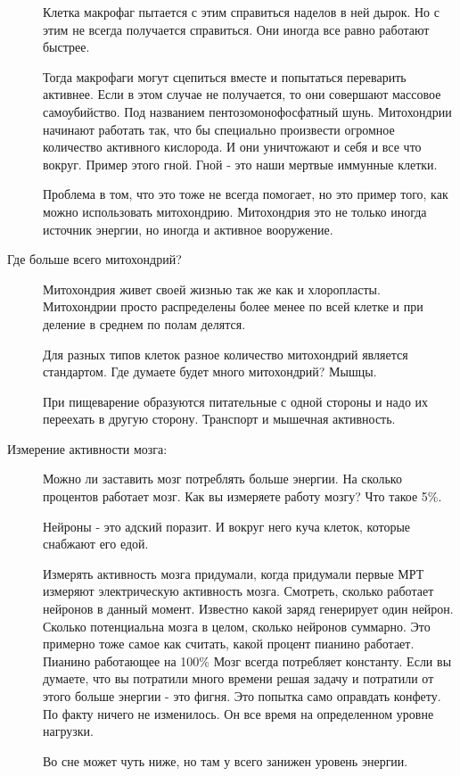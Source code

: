 \begin{description}
Клетка макрофаг пытается с этим справиться наделов в ней дырок. Но 
с этим не всегда получается справиться. Они иногда все равно работают быстрее. 

Тогда макрофаги могут сцепиться вместе и попытаться переварить активнее. 
Если в этом случае не получается, то они совершают массовое самоубийство. 
Под  названием пентозомонофосфатный шунь. Митохондрии начинают работать 
так, что бы специально произвести огромное количество активного кислорода. 
И они уничтожают и себя и все что вокруг. Пример этого гной. Гной - это наши 
мертвые иммунные клетки. 

Проблема в том, что это тоже не всегда помогает, но это 
пример того, как можно использовать митохондрию. Митохондрия 
это не только иногда источник энергии, но иногда и 
активное вооружение. 

\item[Где больше всего митохондрий?]
Митохондрия живет своей жизнью так же как и хлоропласты. Митохондрии 
просто распределены более менее по всей клетке и при деление 
в среднем по полам делятся. 


Для разных типов клеток разное количество митохондрий является стандартом. 
Где думаете будет много митохондрий? Мышцы. 

При пищеварение образуются питательные с одной стороны и надо их 
переехать в другую сторону. Транспорт и мышечная активность. 

\item[Измерение активности мозга:]
Можно ли заставить мозг потреблять больше энергии. 
На сколько процентов работает мозг. Как вы измеряете работу мозгу? Что такое 
5\%. 

Нейроны - это адский поразит. И вокруг него куча клеток, которые снабжают его едой. 

Измерять активность мозга придумали, когда придумали первые МРТ измеряют 
электрическую активность мозга. Смотреть, сколько работает нейронов в данный момент. 
Известно какой заряд генерирует один нейрон. Сколько потенциальна мозга в целом, сколько
нейронов суммарно. Это примерно тоже самое как считать, какой 
процент пианино работает. Пианино работающее на 100\% Мозг всегда потребляет константу. 
Если вы думаете, что вы потратили много времени решая задачу и потратили от этого 
больше энергии - это фигня. Это попытка само оправдать конфету. По 
факту ничего не изменилось. Он все время на определенном уровне нагрузки. 

Во сне может чуть ниже, но там у всего занижен уровень энергии.  
\end{description}

